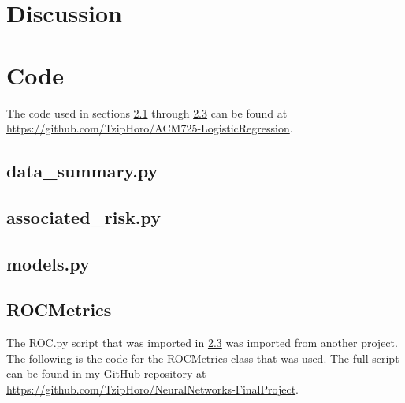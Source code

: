 \documentclass[journal,12pt,onecolumn]{article}
\begin{document}
\section{Discussion}




\clearpage

\singlespacing



\clearpage
\onecolumn

\appendix
\renewcommand{\thesection}{\Alph{section}}

\section{Code}\label{sec:code}
The code used in sections \ref{subsec:data_summary.py} through \ref{subsec:models.py} can be found at \href{https://github.com/TzipHoro/ACM725-LogisticRegression}{https://github.com/TzipHoro/ACM725-LogisticRegression}.

\subsection{data\_summary.py}\label{subsec:data_summary.py}


\clearpage

\subsection{associated\_risk.py}\label{subsec:associated_risk.py}


\clearpage

\subsection{models.py}\label{subsec:models.py}


\clearpage

\subsection{ROCMetrics}\label{subsec:ROC.py}
The ROC.py script that was imported in \ref{subsec:models.py} was imported from another project. The following is the code for the ROCMetrics class that was used. The full script can be found in my GitHub repository at \href{https://github.com/TzipHoro/NeuralNetworks-FinalProject/blob/master/ROC.py}{https://github.com/TzipHoro/NeuralNetworks-FinalProject}. 


\end{document}
